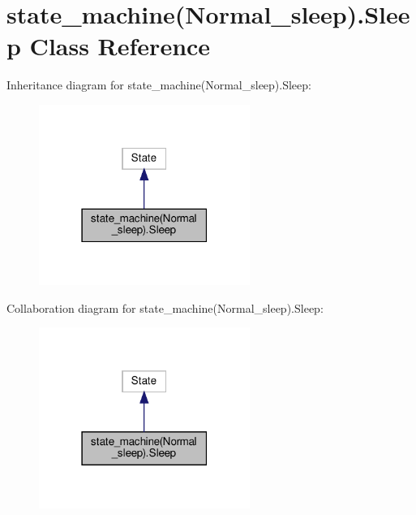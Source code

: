 \hypertarget{classstate__machine_07Normal__sleep_08_1_1Sleep}{}\section{state\+\_\+machine(Normal\+\_\+sleep).Sleep Class Reference}
\label{classstate__machine_07Normal__sleep_08_1_1Sleep}


Inheritance diagram for state\+\_\+machine(Normal\+\_\+sleep).Sleep\+:
\nopagebreak
\begin{figure}[H]
\begin{center}
\leavevmode
\includegraphics[width=195pt]{classstate__machine_07Normal__sleep_08_1_1Sleep__inherit__graph}
\end{center}
\end{figure}


Collaboration diagram for state\+\_\+machine(Normal\+\_\+sleep).Sleep\+:
\nopagebreak
\begin{figure}[H]
\begin{center}
\leavevmode
\includegraphics[width=195pt]{classstate__machine_07Normal__sleep_08_1_1Sleep__coll__graph}
\end{center}
\end{figure}
